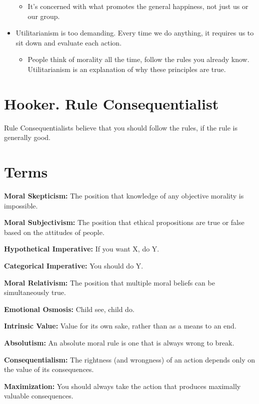 \documentclass[12pt]{article}
\begin{document}
\begin{itemize}
          \begin{itemize}
              \item It's concerned with what promotes the general happiness, not just us or our group.
          \end{itemize}
    \item Utilitarianism is too demanding. Every time we do anything, it requires us to sit down and evaluate each action.
          \begin{itemize}
              \item People think of morality all the time, follow the rules you already know. Utilitarianism is an explanation of why these principles are true.
          \end{itemize}
\end{itemize}

\section{Hooker. Rule Consequentialist}
Rule Consequentialists believe that you should follow the rules, if the rule is generally good.

\section{Terms}

\noindent

\textbf{Moral Skepticism:} The position that knowledge of any objective morality is impossible.

\textbf{Moral Subjectivism:} The position that ethical propositions are true or false based on the attitudes of people.

\textbf{Hypothetical Imperative:} If you want X, do Y.

\textbf{Categorical Imperative:} You should do Y.

\textbf{Moral Relativism:} The position that multiple moral beliefs can be simultaneously true.

\textbf{Emotional Osmosis:} Child see, child do.

\textbf{Intrinsic Value:} Value for its own sake, rather than as a means to an end.

\textbf{Absolutism:} An absolute moral rule is one that is always wrong to break.

\textbf{Consequentialism:} The rightness (and wrongness) of an action depends only on the value of its consequences.

\textbf{Maximization:} You should always take the action that produces maximally valuable consequences.
\end{document}
